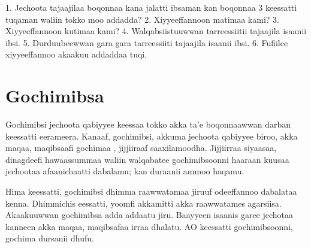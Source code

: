 \documentclass[11pt,b5paper]{book}
\begin{document}
1. Jechoota tajaajilaa boqonnaa kana jalatti ibsaman kan
boqonnaa 3 keessatti tuqaman waliin tokko moo addadda?
2. Xiyyeeffannoon matimaa kami?
3. Xiyyeeffannoon kutimaa kami?
4. Walqabsiistuuwwan tarreessiitii tajaajila isaanii ibsi.
5. Durduubeewwan gara gara tarreessiiti tajaajila isaanii ibsi.
6. Fufiilee xiyyeeffannoo akaakuu addaddaa tuqi.

\newpage

\section{Gochimibsa}
Gochimibsi jechoota qabiyyee keessaa tokko akka ta’e boqonnaawwan darban keessatti eerameera. Kanaaf, gochimibsi, akkuma jechoota qabiyyee biroo, akka maqaa, maqibsaafi gochimaa , jijjiiraaf saaxilamoodha. Jijjiirraa
siyaasaa, dinagdeefi hawaassummaa waliin walqabatee gochimibsoonni haaraan kuusaa jechootaa afaanichaatti
dabalamu; kan duraanii ammoo haqamu. 

Hima keessatti, gochimibsi dhimma raawwatamaa jiruuf odeeffannoo dabalataa kenna. Dhimmichis eessatti, yoomfi
akkamitti akka raawwatames agarsiisa. Akaakuuwwan gochimibsa adda addaatu jiru. Baayyeen isaanis garee
jechotaa kanneen akka maqaa, maqibsafaa irraa dhalatu. AO keessatti gochimibsoonni, gochima dursanii dhufu. 
\end{document}
